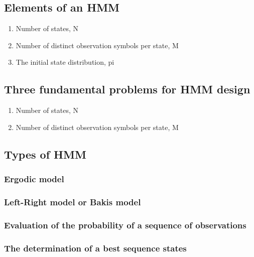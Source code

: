 \subsection{Elements of an HMM}
\begin{enumerate}
	\item Number of states, N
	\item Number of distinct observation symbols per state, M
\item The initial state distribution, pi
\end{enumerate}
\subsection{Three fundamental problems for HMM design}
\begin{enumerate}
	\item Number of states, N
	\item Number of distinct observation symbols per state, M
\end{enumerate}
\subsection{Types of HMM}
\subsubsection{Ergodic model}
\subsubsection{Left-Right model or Bakis model}
\subsubsection{Evaluation of the probability of a sequence of observations}
\subsubsection{The determination of a best sequence states}
